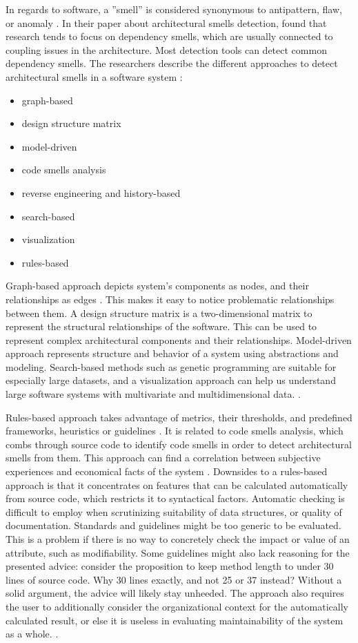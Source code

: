 \documentclass[utf8,english]{gradu3}
\begin{document}
In regards to software, a ''smell'' is considered synonymous to
antipattern, flaw, or anomaly \parencite[1]{Mumtaz2021}. In their paper about
architectural smells detection, \textcite[20]{Mumtaz2021} found that research
tends to focus on dependency smells, which are usually connected
to coupling issues in the architecture. Most
detection tools can detect common dependency smells. The researchers describe the different
approaches to detect architectural smells in a software system
\parencite[8-14]{Mumtaz2021}:
\begin{itemize}
  \item  graph-based
  \item design structure matrix
  \item model-driven
  \item code smells analysis
  \item reverse engineering and history-based
  \item search-based
  \item visualization
  \item rules-based
\end{itemize}

Graph-based approach depicts system's components as nodes, and their
relationships as edges \parencite{Mumtaz2021}. This makes it easy to notice
problematic relationships between them. A design structure matrix is a
two-dimensional matrix to represent the structural relationships of the
software. This can be used to represent complex architectural components and
their relationships. Model-driven approach represents structure and
behavior of a system using abstractions and modeling. Search-based
methods such as genetic programming are suitable for especially large datasets,
and a visualization approach can help us understand large software
systems with multivariate and multidimensional data.
\parencite[9-14]{Mumtaz2021}.

Rules-based approach takes advantage of metrics, their thresholds, and
predefined frameworks, heuristics or guidelines \parencite[8]{Mumtaz2021}. It is
related to code smells analysis, which combs through source code to identify
code smells in order to detect architectural smells from them. This approach can
find a correlation between subjective experiences and economical facts of the
system \parencite[22]{Broy2006}. Downsides to a rules-based approach is that it
concentrates on features that can be calculated automatically from source code,
which restricts it to syntactical factors. Automatic checking is difficult to
employ when scrutinizing suitability of data structures, or quality of
documentation. Standards and guidelines might be too generic to be evaluated.
This is a problem if there is no way to concretely check the impact or value of
an attribute, such as modifiability. Some guidelines might also lack reasoning
for the presented advice: consider the proposition to keep method length to
under 30 lines of source code. Why 30 lines exactly, and not 25 or 37 instead? Without a solid
argument, the advice will likely stay unheeded. The approach also requires the
user to additionally consider the organizational context for the automatically
calculated result, or else it is useless in evaluating maintainability of the
system as a whole. \parencite[22]{Broy2006}.
\end{document}
